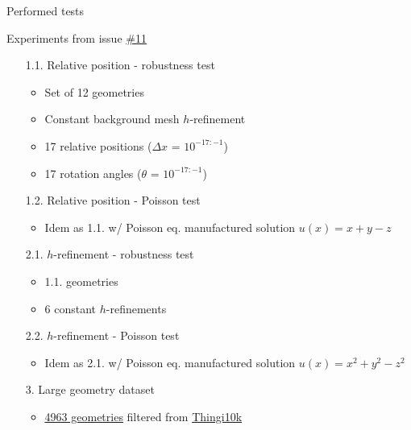 \documentclass{beamer}
\title{}
\subtitle{STLCutter.jl}
\date{\today}
\author{Pere Antoni Martorell}
\institute{\url{http://github.com/pmartorell/STLCutters.jl}}
\begin{document}
\maketitle
\begin{frame}{Performed tests}

  Experiments from issue
  \href{https://github.com/pmartorell/STLCutters.jl/issues/11}{\#11}

  \vfill{}

  \begin{itemize}
    \item[1.1.] 
      Relative position - robustness test
      \begin{itemize}
        \item
          Set of 12 geometries
        \item
          Constant background mesh $h$-refinement%
        \item
          17 relative positions ($\Delta x$ = $10^{-17:-1}$)
        \item
          17 rotation angles ($\theta$ = $10^{-17:-1}$)
      \end{itemize}
    \item[1.2.]
      Relative position - Poisson test
      \begin{itemize}
        \item
          Idem as 1.1. w/ Poisson eq. manufactured solution $u(x) = x+y-z$
      \end{itemize}
    \item[2.1.]
      $h$-refinement - robustness test
      \begin{itemize}
        \item
          1.1. geometries
        \item
          6 constant $h$-refinements
      \end{itemize}
    \item[2.2.]
      $h$-refinement - Poisson test
      \begin{itemize}
        \item
          Idem as 2.1. w/ Poisson eq. manufactured solution $u(x) = x^2+y^2-z^2$
      \end{itemize}
    \item[3.] Large geometry dataset
      \begin{itemize}
        \item   
          \href{https://ten-thousand-models.appspot.com/results.html?q=is+solid\%2C+is+manifold}
          {\underline{4963 geometries}}
          filtered from \href{https://ten-thousand-models.appspot.com}{Thingi10k}

\end{itemize}
\end{itemize}
\end{frame}
\end{document}
